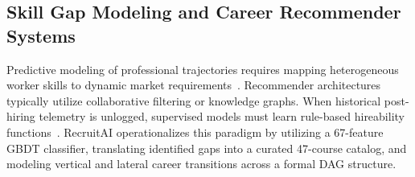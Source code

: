 \documentclass[conference]{IEEEtran}
\begin{document}
\subsection{Skill Gap Modeling and Career Recommender Systems}
Predictive modeling of professional trajectories requires mapping heterogeneous worker skills to dynamic market requirements~\cite{zhang2023job}. Recommender architectures typically utilize collaborative filtering or knowledge graphs. When historical post-hiring telemetry is unlogged, supervised models must learn rule-based hireability functions~\cite{friedman2001greedy}. RecruitAI operationalizes this paradigm by utilizing a 67-feature GBDT classifier, translating identified gaps into a curated 47-course catalog, and modeling vertical and lateral career transitions across a formal DAG structure.
\end{document}
